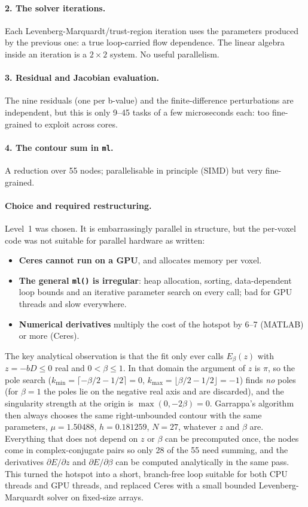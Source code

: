 \documentclass[11pt]{article}
\begin{document}
\paragraph{2. The solver iterations.} Each Levenberg-Marquardt/trust-region iteration uses the
parameters produced by the previous one: a true loop-carried flow dependence. The linear algebra
inside an iteration is a $2\times2$ system. No useful parallelism.

\paragraph{3. Residual and Jacobian evaluation.} The nine residuals (one per b-value) and the
finite-difference perturbations are independent, but this is only 9--45 tasks of a few
microseconds each: too fine-grained to exploit across cores.

\paragraph{4. The contour sum in \texttt{ml}.} A reduction over 55 nodes; parallelisable in
principle (SIMD) but very fine-grained.

\paragraph{Choice and required restructuring.} Level~1 was chosen. It is embarrassingly
parallel in structure, but the per-voxel code was not suitable for parallel hardware as written:
\begin{itemize}
    \item \textbf{Ceres cannot run on a GPU}, and allocates memory per voxel.
    \item \textbf{The general \texttt{ml()} is irregular}: heap allocation, sorting, data-dependent
        loop bounds and an iterative parameter search on every call; bad for GPU threads and slow
        everywhere.
    \item \textbf{Numerical derivatives} multiply the cost of the hotspot by 6--7 (MATLAB) or more
        (Ceres).
\end{itemize}
The key analytical observation is that the fit only ever calls $E_\beta(z)$ with $z = -bD \le 0$
real and $0 < \beta \le 1$. In that domain the argument of $z$ is $\pi$, so the pole search
($k_{\min} = \lceil -\beta/2 - 1/2 \rceil = 0$, $k_{\max} = \lfloor \beta/2 - 1/2 \rfloor = -1$)
finds \emph{no} poles (for $\beta = 1$ the poles lie on the negative real axis and are discarded),
and the singularity strength at the origin is $\max(0, -2\beta) = 0$. Garrappa's algorithm
then always chooses the same right-unbounded contour with the same parameters,
$\mu = 1.50488$, $h = 0.181259$, $N = 27$, whatever $z$ and $\beta$ are. Everything that does
not depend on $z$ or $\beta$ can be precomputed once, the nodes come in complex-conjugate pairs
so only 28 of the 55 need summing, and the derivatives $\partial E/\partial z$ and
$\partial E/\partial \beta$ can be computed analytically in the same pass. This turned the
hotspot into a short, branch-free loop suitable for both CPU threads and GPU threads, and
replaced Ceres with a small bounded Levenberg-Marquardt solver on fixed-size arrays.
\end{document}

